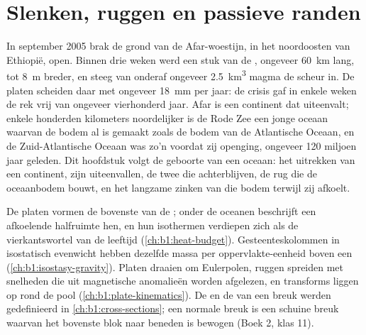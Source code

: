 \chapter{Slenken, ruggen en passieve randen}\label{ch:b1:rifts-ridges-margins}

In september 2005 brak de grond van de Afar-woestijn, in het noordoosten van Ethiopië, open. Binnen drie weken werd een stuk van de , ongeveer \qty{60}{km} lang, tot \qty{8}{m} breder, en steeg van onderaf ongeveer \qty{2.5}{km^3} magma de scheur in. De platen scheiden daar met ongeveer \qty{18}{mm} per jaar: de crisis gaf in enkele weken de rek vrij van ongeveer vierhonderd jaar. Afar is een continent dat uiteenvalt; enkele honderden kilometers noordelijker is de Rode Zee een jonge oceaan waarvan de bodem al is gemaakt zoals de bodem van de Atlantische Oceaan, en de Zuid-Atlantische Oceaan was zo'n  voordat zij openging, ongeveer 120 miljoen jaar geleden. Dit hoofdstuk volgt de geboorte van een oceaan: het uitrekken van een continent, zijn uiteenvallen, de twee  die achterblijven, de rug die de oceaanbodem bouwt, en het langzame zinken van die bodem terwijl zij afkoelt.

\begin{recall}
De platen vormen de bovenste  van de ; onder de oceanen beschrijft een afkoelende halfruimte hen, en hun isothermen verdiepen zich als de vierkantswortel van de leeftijd (\cref{ch:b1:heat-budget}). Gesteenteskolommen in isostatisch evenwicht hebben dezelfde massa per oppervlakte-eenheid boven een  (\cref{ch:b1:isostasy-gravity}). Platen draaien om Eulerpolen, ruggen spreiden met snelheden die uit magnetische anomalieën worden afgelezen, en transforms liggen op  rond de pool (\cref{ch:b1:plate-kinematics}). De  en de  van een breuk werden gedefinieerd in \cref{ch:b1:cross-sections}; een normale breuk is een schuine breuk waarvan het bovenste blok naar beneden is bewogen (Boek 2, klas 11).
\end{recall}

